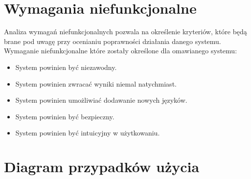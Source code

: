 \section{Wymagania niefunkcjonalne}
\label{sec:wymaganiaNiefunkcjonalne}
Analiza wymagań niefunkcjonalnych pozwala na określenie kryteriów, które będą brane pod uwagę przy ocenianiu poprawności działania danego systemu. \\
Wymaganie niefunkcjonalne które zostały określone dla omawianego systemu:
\begin{itemize}
\item System powinien być niezawodny.
\item System powinien zwracać wyniki niemal natychmiast.
\item System powinien umożliwiać dodawanie nowych języków.
\item System powinien być bezpieczny.
\item System powinien być intuicyjny w użytkowaniu.
\end{itemize}

\section{Diagram przypadków użycia}
\label{sec:przypadkiUzycia}
\noindent
\begin{minipage}{\linewidth}
\label{use-case}
\end{minipage}

